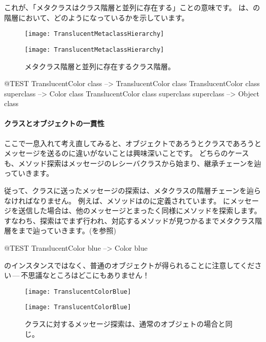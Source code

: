 \documentclass[a4paper,10pt,twoside]{book}
\begin{document}
\noindent
これが、「メタクラスはクラス階層と並列に存在する」ことの意味です。 は、の階層において、どのようになっているかを示しています。

\begin{center}
\begin{figure}[!ht]
\ifluluelse
	{\centerline {\texttt{[image: TranslucentMetaclassHierarchy]}}}
	{\centerline {\texttt{[image: TranslucentMetaclassHierarchy]}}}
\caption{メタクラス階層と並列に存在するクラス階層。}
\end{figure}
\end{center}

\begin{code}{@TEST}
TranslucentColor class                                     --> TranslucentColor class
TranslucentColor class superclass                   --> Color class
TranslucentColor class superclass superclass --> Object class
\end{code}

\paragraph{クラスとオブジェクトの一貫性}
ここで一息入れて考え直してみると、オブジェクトであろうとクラスであろうとメッセージを送るのに違いがないことは興味深いことです。
どちらのケースも、メソッド探索はメッセージのレシーバクラスから始まり、継承チェーンを辿っていきます。

従って、クラスに送ったメッセージの探索は、メタクラスの階層チェーンを辿らなければなりません。
例えば、メソッドはのに定義されています。
にメッセージを送信した場合は、他のメッセージとまったく同様にメソッドを探索します。
すなわち、探索はでまず行われ、対応するメソッドが見つかるまでメタクラス階層をまで辿っていきます。(を参照)

\begin{code}{@TEST}
TranslucentColor blue --> Color blue
\end{code}
\noindent
{}のインスタンスではなく、普通のオブジェクトが得られることに注意してください\,---\,不思議なところはどこにもありません！

\begin{center}
\begin{figure}[!ht]
\ifluluelse
	{\centerline {\texttt{[image: TranslucentColorBlue]}}}
	{\centerline {\texttt{[image: TranslucentColorBlue]}}}
\caption{クラスに対するメッセージ探索は、通常のオブジェトの場合と同じ。}
\end{figure}
\end{center}
\end{document}
